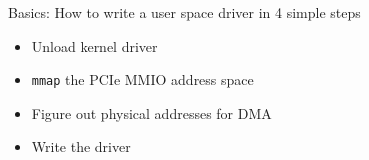 \documentclass[NET,english,aspectratio=43,notitleframe]{tumbeamer}
\begin{document}
\begin{frame}{Basics: How to write a user space driver in 4 simple steps}
\begin{itemize}
\item[1.] Unload kernel driver
\item[2.] \texttt{mmap} the PCIe MMIO address space
\item[3.] Figure out physical addresses for DMA
\item[4.] Write the driver
\end{itemize}
\end{frame}




\end{document}
